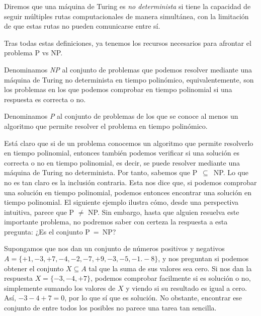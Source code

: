     \begin{definicion} \cite{MTND}
        Diremos que una máquina de Turing es \textit{no determinista} si tiene la capacidad de seguir múltiples rutas computacionales de manera simultánea, con la limitación de que estas rutas no pueden comunicarse entre sí.
    \end{definicion}

    Tras todas estas definiciones, ya tenemos los recursos necesarios para afrontar el problema P vs NP.
    
    \begin{definicion} \cite{probNP}
        Denominamos \textit{NP} al conjunto de problemas que podemos resolver mediante una máquina de Turing no determinista en tiempo polinómico, equivalentemente, son los problemas en los que podemos comprobar en tiempo polinomial si una respuesta es correcta o no.
    \end{definicion}

    \begin{definicion} \cite{probP}
        Denominamos \textit{P} al conjunto de problemas de los que se conoce al menos un algoritmo que permite resolver el problema en tiempo polinómico.
    \end{definicion}

    Está claro que si de un problema conocemos un algoritmo que permite resolverlo en tiempo polinomial, entonces también podemos verificar si una solución es correcta o no en tiempo polinomial, es decir, se puede resolver mediante una máquina de Turing no determinista. Por tanto, sabemos que P~$\subseteq$~NP. Lo que no es tan claro es la inclusión contraria. Esta nos dice que, si podemos comprobar una solución en tiempo polinomial, podemos entonces encontrar una solución en tiempo polinomial. El siguiente ejemplo ilustra cómo, desde una perspectiva intuitiva, parece que P $\neq$ NP. Sin embargo, hasta que alguien resuelva este importante problema, no podremos saber con certeza la respuesta a esta pregunta: ¿Es el conjunto P~=~NP?

    \begin{ejemplo}
        Supongamos que nos dan un conjunto de números positivos y negativos $A = \{+1, -3, +7, -4, -2, -7, +9, -3, -5, -1. -8\}$, y nos preguntan si podemos obtener el conjunto $X \subseteq A$ tal que la suma de sus valores sea cero. Si nos dan la respuesta $X = \{-3, -4, +7\}$, podemos comprobar facilmente si es solución o no, simplemente sumando los valores de $X$ y viendo si su resultado es igual a cero. Así, $-3-4+7 = 0$, por lo que sí que es solución. No obstante, encontrar ese conjunto de entre todos los posibles no parece una tarea tan sencilla.
    \end{ejemplo}

